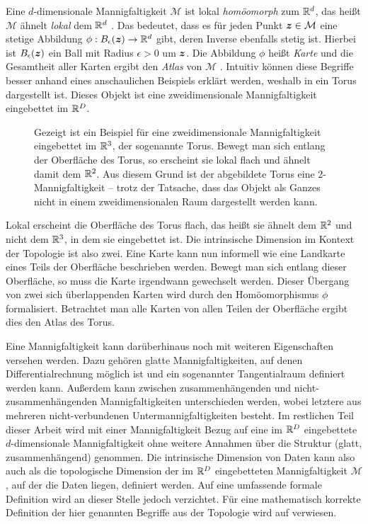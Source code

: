 Eine $d$-dimensionale Mannigfaltigkeit $\mathcal{M}$ ist lokal \textit{homöomorph} zum $\mathbb{R}^d$,
das heißt $\mathcal{M}$ ähnelt \textit{lokal} dem $\mathbb{R}^d$ \parencite[3]{Lee.2011}. Das bedeutet, dass es für jeden Punkt $\bm{z} \in \mathcal{M}$ eine stetige
Abbildung $\phi: B_\epsilon(\bm{z}) \rightarrow \mathbb{R}^d$ gibt, deren Inverse ebenfalls stetig
ist. Hierbei ist $B_\epsilon(\bm{z})$ ein Ball mit Radius $\epsilon > 0$ um $\bm{z}$. Die
Abbildung $\phi$ heißt \textit{Karte} und die Gesamtheit aller Karten ergibt den \textit{Atlas} von
$\mathcal{M}$ \parencite[4]{Cayton.2005}. Intuitiv können diese Begriffe besser anhand eines anschaulichen Beispiels
erklärt werden, weshalb in  ein Torus dargestellt ist. Dieses Objekt ist eine
zweidimensionale Mannigfaltigkeit eingebettet im $\mathbb{R}^D$.
\begin{figure}[ht]
	\centering
	
	\caption{Gezeigt ist ein Beispiel für eine zweidimensionale Mannigfaltigkeit eingebettet im $\mathbb{R}^3$, der sogenannte Torus. Bewegt man sich entlang der Oberfläche des Torus, so erscheint sie lokal flach und ähnelt damit dem $\mathbb{R}^2$. Aus diesem Grund ist der abgebildete Torus eine 2-Mannigfaltigkeit -- trotz der Tatsache, dass das Objekt als Ganzes nicht in einem zweidimensionalen Raum dargestellt werden kann.}
	\label{fig:Torus}
\end{figure}
Lokal erscheint die Oberfläche des Torus flach, das heißt sie ähnelt dem $\mathbb{R}^2$ und nicht dem $\mathbb{R}^3$, in dem sie eingebettet ist. Die intrinsische Dimension im Kontext der Topologie ist also zwei. Eine Karte kann nun informell wie eine Landkarte eines Teils der Oberfläche beschrieben werden. Bewegt man sich entlang
dieser Oberfläche, so muss die Karte irgendwann gewechselt werden. Dieser Übergang von zwei sich
überlappenden Karten wird durch den Homöomorphismus $\phi$ formalisiert. Betrachtet man alle Karten
von allen Teilen der Oberfläche ergibt dies den Atlas des Torus.

Eine Mannigfaltigkeit kann darüberhinaus noch mit weiteren Eigenschaften versehen werden. Dazu
gehören glatte Mannigfaltigkeiten, auf denen Differentialrechnung möglich ist und ein sogenannter
Tangentialraum definiert werden kann. Außerdem kann zwischen zusammenhängenden und
nicht-zusammenhängenden Mannigfaltigkeiten unterschieden werden, wobei letztere aus mehreren
nicht-verbundenen Untermannigfaltigkeiten besteht. Im restlichen Teil dieser Arbeit wird mit einer
Mannigfaltigkeit Bezug auf eine im $\mathbb{R}^D$ eingebettete $d$-dimensionale Mannigfaltigkeit ohne
weitere Annahmen über die Struktur (glatt, zusammenhängend) genommen. Die intrinsische Dimension
von Daten kann also auch als die topologische Dimension der im $\mathbb{R}^D$ eingebetteten
Mannigfaltigkeit $\mathcal{M}$, auf der die Daten liegen, definiert werden. Auf eine umfassende
formale Definition wird an dieser Stelle jedoch verzichtet. Für eine mathematisch korrekte
Definition der hier genannten Begriffe aus der Topologie wird auf \textcites{Lee.2011}{Lee.2012}
verwiesen.

